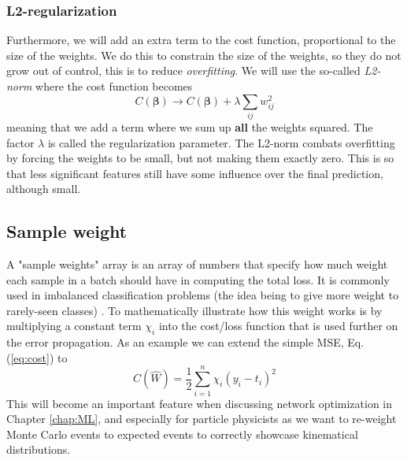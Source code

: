 \documentclass[12pt, a4paper]{book}
\begin{document}
\subsubsection*{L2-regularization}
Furthermore, we will add an extra term to the cost function, proportional to the size of the weights. We do this to constrain the size of the weights, so they do not grow out of control, 
this is to reduce \textit{overfitting}. We will use the so-called \textit{L2-norm} where the cost function becomes
\begin{equation}\label{eq:L2-reg}
    C(\bm\beta)\rightarrow C(\bm\beta)+\lambda\sum_{ij}w_{ij}^2
\end{equation}
meaning that we add a term where we sum up \textbf{all} the weights squared. The factor $\lambda$ is called the regularization parameter. The L2-norm combats overfitting by forcing the weights to be small, but not making them exactly zero. 
This is so that less significant features still have some influence over the final prediction, although small.


\subsection{Sample weight}\label{sec:sample_weight}
A "sample weights" array is an array of numbers that specify how much weight each sample in a batch should have in computing the total loss. 
It is commonly used in imbalanced classification problems (the idea being to give more weight to rarely-seen classes) \cite{tf_sample_wgt}. To mathematically illustrate how this 
weight works is by multiplying a constant term $\chi_i$ into the cost/loss function that is used further on the error propagation. As an example we can extend the simple MSE, Eq. (\ref{eq:cost}) to
\begin{equation}\label{eq:sample_weight}
    C(\hat{W})=\frac{1}{2}\sum_{i=1}^n\chi_i(y_i-t_i)^2
\end{equation}
This will become an important feature when discussing network optimization in Chapter \ref{chap:ML}, and especially for particle physicists as we want to re-weight Monte Carlo events to expected events to correctly showcase kinematical distributions.
\end{document}
